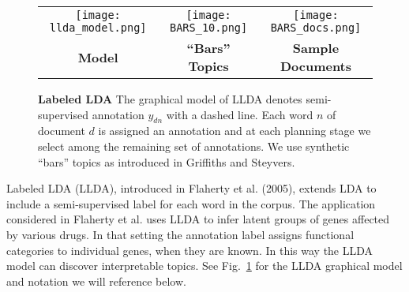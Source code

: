 \documentclass{article}
\begin{document}
\begin{figure}[t]
  \centering
  \begin{tabular}{ccc}
    \texttt{[image: llda\_model.png]} &
    \texttt{[image: BARS\_10.png]} &
    \texttt{[image: BARS\_docs.png]} \\
    {\small \textbf{Model}} & {\small \textbf{``Bars'' Topics}} & {\small \textbf{Sample Documents}}
  \end{tabular}
  \caption{\small \textbf{Labeled LDA} The graphical model of LLDA
    denotes semi-supervised annotation $y_{dn}$ with a dashed line.
    Each word $n$ of document $d$ is assigned an annotation and at
    each planning stage we select among the remaining set of
    annotations.  We use synthetic ``bars'' topics as introduced in
    Griffiths and Steyvers.}
  \label{fig:llda}
\end{figure}

Labeled LDA (LLDA), introduced in Flaherty et al. (2005), extends LDA
to include a semi-supervised label for each word in the corpus.  The
application considered in Flaherty et al. uses LLDA to infer latent
groups of genes affected by various drugs.  In that setting the
annotation label assigns functional categories to individual genes,
when they are known.  In this way the LLDA model can discover
interpretable topics.  See Fig.~\ref{fig:llda} for the LLDA graphical
model and notation we will reference below.
\end{document}
